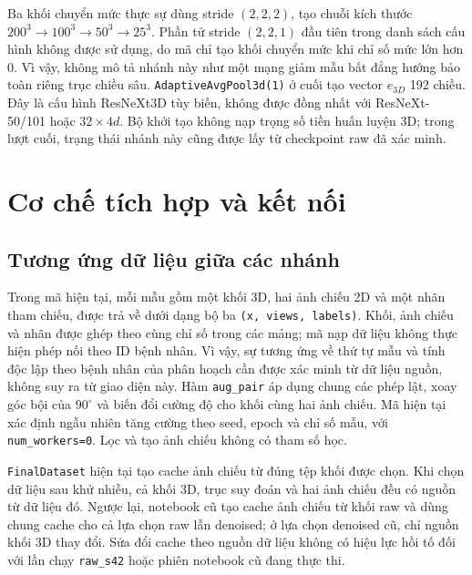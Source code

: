 \documentclass[14pt,a4paper,oneside]{extreport}
\begin{document}
Ba khối chuyển mức thực sự dùng stride $(2,2,2)$, tạo chuỗi kích thước
$200^3\to100^3\to50^3\to25^3$. Phần tử stride $(2,2,1)$ đầu tiên
trong danh sách cấu hình không được sử dụng, do mã chỉ tạo khối chuyển
mức khi chỉ số mức lớn hơn 0. Vì vậy, không mô tả nhánh này như một
mạng giảm mẫu bất đẳng hướng bảo toàn riêng trục chiều sâu.
\texttt{AdaptiveAvgPool3d(1)} ở cuối tạo vector $e_{3D}$ 192 chiều.
Đây là cấu hình ResNeXt3D tùy biến, không được đồng nhất với
ResNeXt-50/101 hoặc $32\times4d$. Bộ khởi tạo không nạp trọng số tiền
huấn luyện 3D; trong lượt cuối, trạng thái nhánh này cũng được lấy từ
checkpoint raw đã xác minh.



\section{Cơ chế tích hợp và kết nối}
\label{sec:integration}
\subsection{Tương ứng dữ liệu giữa các nhánh}
Trong mã hiện tại, mỗi mẫu gồm một khối 3D, hai ảnh chiếu 2D và một
nhãn tham chiếu, được trả về dưới dạng bộ ba \texttt{(x, views, labels)}.
Khối, ảnh chiếu và nhãn được ghép theo cùng chỉ số trong các mảng;
mã nạp dữ liệu không thực hiện phép nối theo ID bệnh nhân. Vì vậy,
sự tương ứng về thứ tự mẫu và tính độc lập theo bệnh nhân của phân
hoạch cần được xác minh từ dữ liệu nguồn, không suy ra từ giao diện này.
Hàm \texttt{aug\_pair} áp dụng chung các phép lật, xoay góc bội của
$90^\circ$ và biến đổi cường độ cho khối cùng hai ảnh chiếu. Mã hiện tại
xác định ngẫu nhiên tăng cường theo seed, epoch và chỉ số mẫu, với
\texttt{num\_workers=0}. Lọc và tạo ảnh chiếu không có tham số học.

\texttt{FinalDataset} hiện tại tạo cache ảnh chiếu từ đúng tệp khối
được chọn. Khi chọn dữ liệu sau khử nhiễu, cả khối 3D, trục suy đoán
và hai ảnh chiếu đều có nguồn từ dữ liệu đó. Ngược lại, notebook cũ
tạo cache ảnh chiếu từ khối raw và dùng chung cache cho cả lựa chọn
raw lẫn denoised; ở lựa chọn denoised cũ, chỉ nguồn khối 3D thay đổi.
Sửa đổi cache theo nguồn dữ liệu không có hiệu lực hồi tố đối với
lần chạy \texttt{raw\_s42} hoặc phiên notebook cũ đang thực thi.
\end{document}
